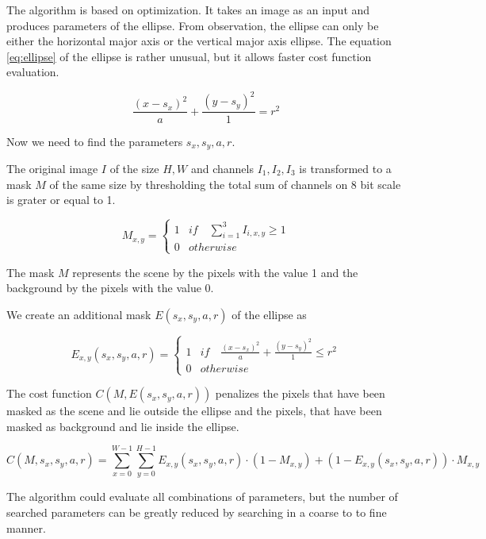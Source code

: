 \documentclass[a4paper,12pt,titlepage]{article}
\numberwithin{figure}{section}
\begin{document}
The algorithm is based on optimization. It takes an image as an input and produces parameters of the ellipse. From observation, the ellipse can only be either the horizontal major axis or the vertical major axis ellipse. The equation \ref{eq:ellipse} of the ellipse is rather unusual, but it allows faster cost function evaluation.

\begin{equation}
\label{eq:ellipse}
\frac{(x-s_x)^2}{a} + \frac{(y-s_y)^2}{1} = r^2
\end{equation}

Now we need to find the parameters $s_x, s_y, a, r$.

The original image $I$ of the size $H, W$ and channels $I_1, I_2, I_3$ is transformed to a mask $M$ of the same size by thresholding the total sum of channels on 8 bit scale is grater or equal to 1. \cite{lukacs1997real}

\begin{equation*}
M_{x,y} = \begin{cases}
1 & if \quad \sum_{i=1}^{3} I_{i,x,y} \geq 1 \\
0 & otherwise
\end{cases}
\end{equation*}

The mask $M$ represents the scene by the pixels with the value 1 and the background by the pixels with the value 0. 

We create an additional mask $E(s_x, s_y, a, r)$ of the ellipse as 

\begin{equation*}
E_{x,y}(s_x, s_y, a, r) = \begin{cases}
1 & if \quad \frac{(x-s_x)^2}{a} + \frac{(y-s_y)^2}{1} \leq r^2 \\
0 & otherwise
\end{cases}
\end{equation*}

The cost function $C(M, E(s_x, s_y, a, r))$ penalizes the pixels that have been masked as the scene and lie outside the ellipse and the pixels, that have been masked as background and lie inside the ellipse.

\begin{equation}
C(M, s_x, s_y, a, r) = \sum_{x = 0}^{W-1} \sum_{y = 0}^{H-1} E_{x,y}(s_x, s_y, a, r) \cdot (1-M_{x,y}) + (1 - E_{x,y}(s_x, s_y, a, r)) \cdot M_{x,y}
\end{equation}

The algorithm could evaluate all combinations of parameters, but the number of searched parameters can be greatly reduced by searching in a coarse to to fine manner. 
\end{document}
